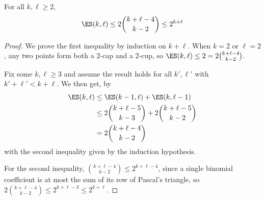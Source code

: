 \begin{boxcorollary}
    For all $k, \ell \geq 2$,
    \begin{align*}
        \ES(k, \ell) \leq 2\binom{k + \ell - 4}{k - 2} \leq 2^{k + \ell}
    \end{align*}
\end{boxcorollary}
\begin{proof}
    We prove the first inequality by induction on $k + \ell$. When $k = 2$ or $\ell = 2$, any two points form both a $2$-cap and a $2$-cup, so $\ES(k, \ell) \leq 2 = 2\binom{k + \ell - 4}{k - 2}$.

    Fix some $k, \ell \geq 3$ and assume the result holds for all $k', \ell'$ with $k' + \ell' < k + \ell$. We then get, by 
    \begin{align*}
        \ES(k, \ell)
        &\leq \ES(k - 1, \ell) + \ES(k, \ell - 1) \\
        &\leq 2\binom{k + \ell - 5}{k - 3} + 2\binom{k + \ell - 5}{k - 2} \\
        &= 2\binom{k + \ell - 4}{k - 2}
    \end{align*}
    with the second inequality given by the induction hypothesis.
    
    For the second inequality, $\binom{k + \ell - 4}{k - 2} \leq 2^{k + \ell - 4}$, since a single binomial coefficient is at most the sum of its row of Pascal's triangle, so $2\binom{k + \ell - 4}{k - 2} \leq 2^{k + \ell - 3} \leq 2^{k + \ell}$.
\end{proof}
